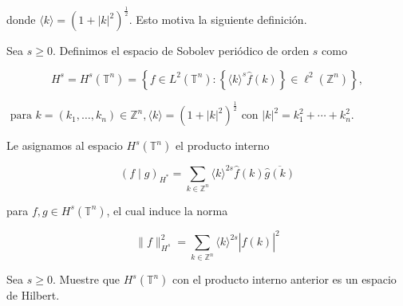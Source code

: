 \documentclass[12pt]{article}
\newcommand\T{\mathbb{T}}
\begin{document}
donde $\langle k\rangle=(1+|k|^2)^{\frac{1}{2}}$. Esto motiva la siguiente definición.


\begin{definition}
Sea $s \geq 0$. Definimos el espacio de Sobolev periódico de orden $s$ como

$$
H^s=H^s(\T^n)=\left\{f \in L^2(\T^n):\left\{\langle k\rangle^s \widehat{f}(k)\right\} \in \ell^2(\mathbb{Z}^n)\right\},
$$

$\text { para } k=\left(k_1, \ldots, k_n\right) \in \mathbb{Z}^n,\langle k\rangle=\left(1+|k|^2\right)^{\frac{1}{2}} \text { con }|k|^2=k_1^2+\cdots+k_n^2 \text {. }
$
\end{definition}

Le asignamos al espacio $H^s\left(\mathbb{T}^n\right)$ el producto interno

\begin{equation}
(f \mid g)_{H^*}=\sum_{k \in \mathbb{Z}^n}\langle k\rangle^{2 s} \widehat{f}(k) \overline{\widehat{g}(k)}
\end{equation}

para $f, g \in H^s\left(\mathbb{T}^n\right)$, el cual induce la norma

$$
\|f\|_{H^s}^2=\sum_{k \in \mathbb{Z}^n}\langle k\rangle^{2 s}|\widehat{f}(k)|^2
$$

\begin{theorem}
Sea $s \geq 0$. Muestre que $H^s\left(\mathbb{T}^n\right)$ con el producto interno anterior es un espacio de Hilbert.
\end{theorem}
\end{document}
